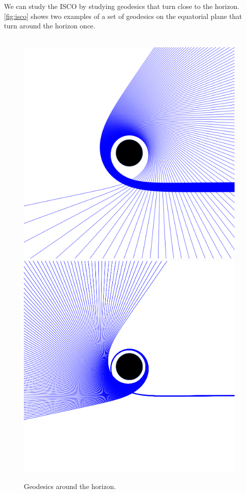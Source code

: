 We can study the \ac{ISCO} by studying geodesics that turn close to the horizon. \autoref{fig:isco} shows two examples of a set of geodesics on the equatorial plane that turn around the horizon once.

\begin{figure}[bth]
	\myfloatalign
	 \\
	{\includegraphics[width=.45\linewidth]{gfx/isco1}} \quad
	{\includegraphics[width=.45\linewidth]{gfx/isco2}}
	\caption[Geodesics around the horizon]{Geodesics around the horizon.}
	\label{fig:isco}
\end{figure}


